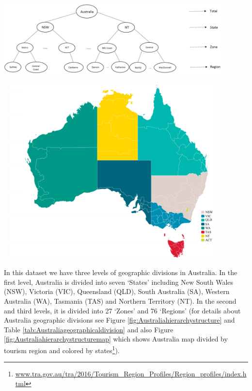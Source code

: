 \documentclass[11pt,a4paper,]{article}
\let\origfigure\figure
\let\endorigfigure\endfigure
\renewenvironment{figure}[1][2] {
    \expandafter\origfigure\expandafter[!htbp]
} {
    \endorigfigure
}
\begin{document}
\begin{figure}

{\centering \includegraphics[width=450px,height=150px]{Paper-Figures/Australian_hierarchy_structure} 

}

\caption{Australian geographic hierarchical structure.}\label{fig:Australiahierarchystructure}
\end{figure}

\begin{figure}

{\centering \includegraphics[width=450px,height=360px]{Paper-Figures/ausTurRegions} 

}

\caption{Australia tourism region map - colors represent states.}\label{fig:Australiahierarchystructuremap}
\end{figure}

In this dataset we have three levels of geographic divisions in
Australia. In the first level, Australia is divided into seven `States'
including New South Wales (NSW), Victoria (VIC), Queensland (QLD), South
Australia (SA), Western Australia (WA), Tasmania (TAS) and Northern
Territory (NT). In the second and third levels, it is divided into 27
`Zones' and 76 `Regions' (for details about Australia geographic
divisions see Figure \ref{fig:Australiahierarchystructure} and Table
\ref{tab:Australiageographicaldivision} and also Figure
\ref{fig:Australiahierarchystructuremap} which shows Australia map
divided by tourism region and colored by states\footnote{\url{www.tra.gov.au/tra/2016/Tourism_Region_Profiles/Region_profiles/index.html}}).
\end{document}

